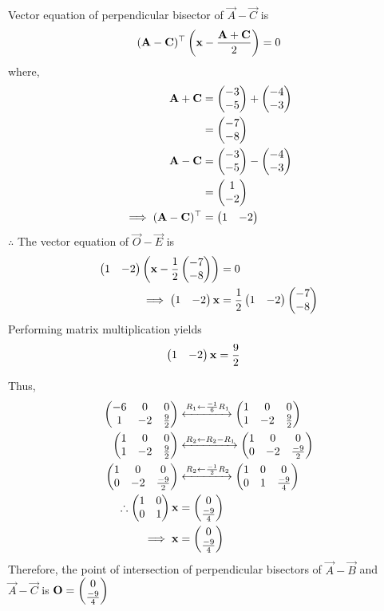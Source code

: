 \documentclass[11pt]{book}
\begin{document}
\begin{enumerate}[label=\thesection.\arabic*.,ref=\thesection.\theenumi]
Vector equation of perpendicular bisector of $\vec{A}-\vec{C}$ is
\begin{align}
(\mathbf{A}-\mathbf{C})^\top\left( \mathbf{x} - \frac{\mathbf{A}+\mathbf{C}}{2}\right) = 0
\end{align}
where,
\begin{align}
\mathbf{A}+\mathbf{C}&=\begin{pmatrix}-3\\-5\end{pmatrix}+\begin{pmatrix}-4\\-3\end{pmatrix}\\
&=\begin{pmatrix}-7\\-8\end{pmatrix}\\
\mathbf{A}-\mathbf{C} &= \begin{pmatrix}-3\\-5\end{pmatrix}-\begin{pmatrix}-4\\-3\end{pmatrix}\\
&=\begin{pmatrix}1\\-2\end{pmatrix}\\
\implies (\mathbf{A}-\mathbf{C})^\top &= \begin{pmatrix}1&-2\end{pmatrix}
\end{align}
$\therefore $ The vector equation of $\vec{O}-\vec{E}$ is
\begin{align}
\begin{pmatrix}1&-2\end{pmatrix}\left( \mathbf{x}-\frac{1}{2}\begin{pmatrix}-7\\-8\end{pmatrix}\right)&=0\\
\implies \begin{pmatrix}1&-2\end{pmatrix}\mathbf{x}&=\frac{1}{2}\begin{pmatrix}1&-2\end{pmatrix}\begin{pmatrix}-7\\-8\end{pmatrix}
\end{align}
Performing matrix multiplication yields
\begin{align}
\begin{pmatrix}1&-2\end{pmatrix}\mathbf{x}&=\frac{9}{2}
\end{align}

Thus,
\begin{align}
\begin{pmatrix}-6&0&0\\1&-2&\frac{9}{2}\end{pmatrix} &\xleftrightarrow[]{R_1 \leftarrow \frac{-1}{6} R_1} \begin{pmatrix}1&0&0\\1&-2&\frac{9}{2}\end{pmatrix}\\
\begin{pmatrix}1&0&0\\1&-2&\frac{9}{2}\end{pmatrix} &\xleftrightarrow[]{R_2\leftarrow R_2 - R_1}
\begin{pmatrix}1&0& 0\\0&-2&\frac{-9}{2}\end{pmatrix}\\
\begin{pmatrix}1&0& 0\\0&-2&\frac{-9}{2}\end{pmatrix} &\xleftrightarrow[]{R_2 \leftarrow \frac{-1}{2}R_2} \begin{pmatrix}1&0&0 \\0&1&\frac{-9}{4}\end{pmatrix}\\
\therefore \begin{pmatrix}1&0\\0&1\end{pmatrix}\mathbf{x} &= \begin{pmatrix}0\\\frac{-9}{4}\end{pmatrix}\\
\implies \mathbf{x}&=\begin{pmatrix}0\\\frac{-9}{4}\end{pmatrix}
\end{align}
Therefore, the point of intersection of perpendicular bisectors of $\vec{A}-\vec{B}$ and $\vec{A}-\vec{C}$ is $\mathbf{O} = \begin{pmatrix}0\\ \frac{-9}{4}\end{pmatrix}$


\end{enumerate}
\end{document}
